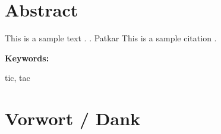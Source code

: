 \section*{Abstract}
This is a sample text . 
.
Patkar \etal
{}
This is a sample citation \cite{boser_hofmann_rezension_2015}.
\vspace{2ex}

\textbf{Keywords:}

tic, tac

\clearpage

\section*{Vorwort / Dank}



